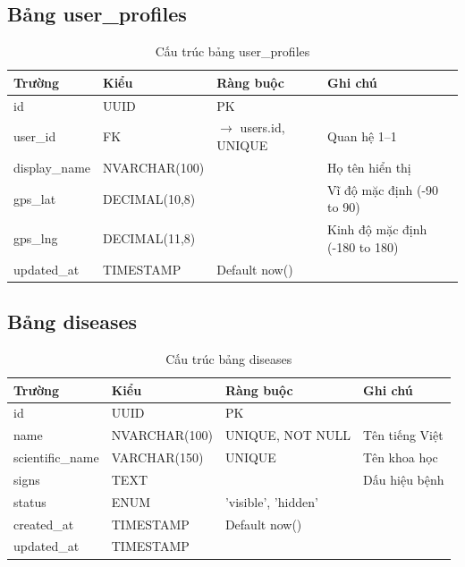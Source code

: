 \documentclass[12pt,a4paper]{article}
\begin{document}
\subsection{Bảng user\_profiles}
\begin{longtable}{|l|l|l|p{5.5cm}|}
    \caption{Cấu trúc bảng user\_profiles}                                                            \\
    \hline
    \rowcolor{headerblue}
    \textbf{Trường} & \textbf{Kiểu} & \textbf{Ràng buộc}             & \textbf{Ghi chú}               \\
    \hline
    id              & UUID          & PK                             &                                \\
    \hline
    user\_id        & FK            & $\rightarrow$ users.id, UNIQUE & Quan hệ 1--1                   \\
    \hline
    display\_name   & NVARCHAR(100) &                                & Họ tên hiển thị                \\
    \hline
    gps\_lat        & DECIMAL(10,8) &                                & Vĩ độ mặc định (-90 to 90)     \\
    \hline
    gps\_lng        & DECIMAL(11,8) &                                & Kinh độ mặc định (-180 to 180) \\
    \hline
    updated\_at     & TIMESTAMP     & Default now()                  &                                \\
    \hline
\end{longtable}

\subsection{Bảng diseases}
\begin{longtable}{|l|l|l|p{5.5cm}|}
    \caption{Cấu trúc bảng diseases}                                          \\
    \hline
    \rowcolor{headerblue}
    \textbf{Trường}  & \textbf{Kiểu} & \textbf{Ràng buộc}  & \textbf{Ghi chú} \\
    \hline
    id               & UUID          & PK                  &                  \\
    \hline
    name             & NVARCHAR(100) & UNIQUE, NOT NULL    & Tên tiếng Việt   \\
    \hline
    scientific\_name & VARCHAR(150)  & UNIQUE              & Tên khoa học     \\
    \hline
    signs            & TEXT          &                     & Dấu hiệu bệnh    \\
    \hline
    status           & ENUM          & 'visible', 'hidden' &                  \\
    \hline
    created\_at      & TIMESTAMP     & Default now()       &                  \\
    \hline
    updated\_at      & TIMESTAMP     &                     &                  \\
    \hline
\end{longtable}
\end{document}
